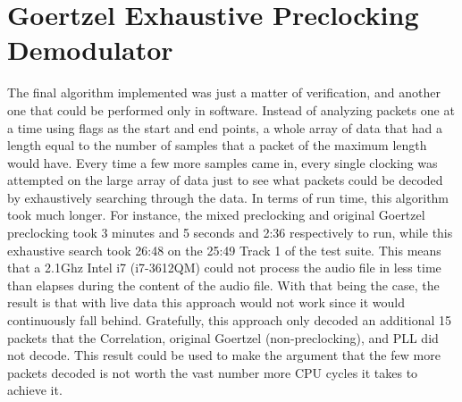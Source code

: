 \section{Goertzel Exhaustive Preclocking Demodulator}
The final algorithm implemented was just a matter of verification, and another one that could be performed only in software. Instead of analyzing packets one at a time using flags as the start and end points, a whole array of data that had a length equal to the number of samples that a packet of the maximum length would have. Every time a few more samples came in, every single clocking was attempted on the large array of data just to see what packets could be decoded by exhaustively searching through the data. In terms of run time, this algorithm took much longer. For instance, the mixed preclocking and original Goertzel preclocking took 3 minutes and 5 seconds and 2:36 respectively to run, while this exhaustive search took 26:48 on the 25:49 Track 1 of the test suite. This means that a 2.1Ghz Intel i7 (i7-3612QM) could not process the audio file in less time than elapses during the content of the audio file. With that being the case, the result is that with live data this approach would not work since it would continuously fall behind. Gratefully, this approach only decoded an additional 15 packets that the Correlation, original Goertzel (non-preclocking), and PLL did not decode. This result could be used to make the argument that the few more packets decoded is not worth the vast number more CPU cycles it takes to achieve it.

